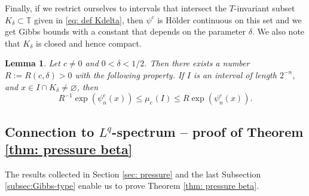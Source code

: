 \documentclass[11pt,reqno]{amsart}
\theoremstyle{plain}
\newtheorem{lemma}[theorem]{Lemma}
\theoremstyle{definition}
\newcommand{\pa}{\phantom{a}}
\renewcommand{\emptyset}{\varnothing}
\newcommand{\TT}{\mathbb{T}}
\begin{document}
Finally, if we restrict ourselves to intervals that intersect the $T$-invariant subset $K_{\delta} \subset \TT$ given in \eqref{eq: def Kdelta}, then $\psi^c$ is H\"older continuous on this set and we get Gibbs bounds with a constant that depends on the parameter $\delta$. 
We also note that $K_\delta$ is closed and hence compact.
 
\begin{lemma}
\label{LEM:mu-on-Kdelta}
Let $c \neq 0$ and $0 < \delta < 1/2$. Then there exists a number $R:=R(c,\delta)>0$ with the following property. If $I$ is an interval of length $2^{-n}$, and  $x \in I \cap K_\delta \neq \emptyset$, then
\[
  R^{-1} \exp \left(\psi^c_n (x)\right)
  \leqslant  \mu^{\pa}_{c}(I)
  \leqslant R \exp \left(\psi^c_n (x)\right). 
\]
\end{lemma}










\subsection{Connection to $L^q$-spectrum -- proof of Theorem \ref{thm: pressure beta}}\label{subsec: Lq spectrum}


The results collected in Section \ref{sec: pressure} and the last Subsection \ref{subsec:Gibbs-type} enable us to prove Theorem \ref{thm: pressure beta}. 
\end{document}
